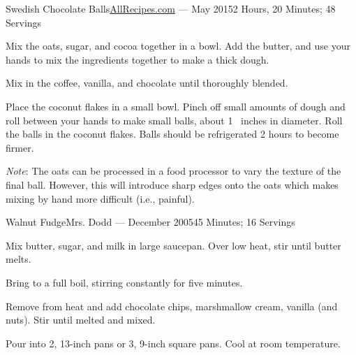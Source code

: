 \documentclass{article}
\begin{document}
\begin{recipe}{Swedish Chocolate Balls}{\href{http://www.allrecipes.com/recipe/swedish-chocolate-balls-or-coconut-balls/}{AllRecipes.com} --- May 2015}{2 Hours, 20 Minutes; 48 Servings}

   Mix the oats, sugar, and cocoa together in a bowl. Add the butter, and use your
   hands to mix the ingredients together to make a thick dough. 
   
   Mix in the coffee, vanilla, and chocolate until thoroughly blended.
   
   Place the coconut flakes in a small bowl. Pinch off small amounts of dough and
   roll between your hands to make small balls, about 1\  inches in diameter.
   Roll the balls in the coconut flakes. Balls should be refrigerated 2 hours to
   become firmer.
   
   \freeform 
   \emph{Note}: The oats can be processed in a food processor to vary the
   texture of the final ball.  However, this will introduce sharp edges onto
   the oats which makes mixing by hand more difficult (i.e., painful).

\end{recipe}

\begin{recipe}{Walnut Fudge}{Mrs. Dodd --- December 2005}{45 Minutes; 16 Servings}

   Mix butter, sugar, and milk in large saucepan.  Over low heat, stir until
   butter melts.  

   \newstep
   Bring to a full boil, stirring constantly for five minutes.

   Remove from heat and add chocolate chips, marshmallow cream, vanilla (and
   nuts).  Stir until melted and mixed.

   \newstep
   Pour into 2, 13-inch pans or 3, 9-inch square pans.  Cool at room temperature.

\end{recipe}

\end{document}

